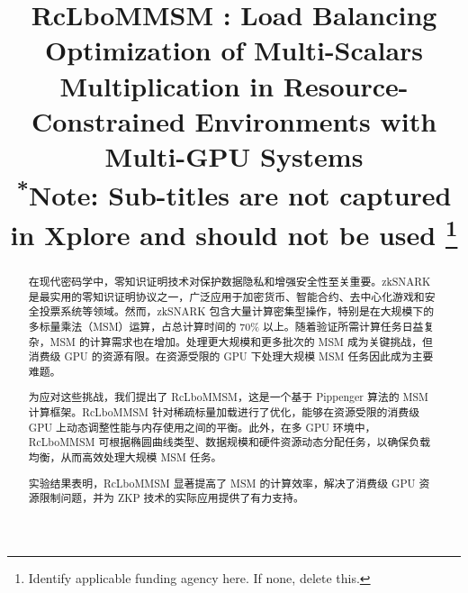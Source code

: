 \documentclass[conference]{IEEEtran}
\begin{document}
\title{RcLboMMSM : Load Balancing Optimization of Multi-Scalars Multiplication in Resource-Constrained Environments with Multi-GPU Systems\\
{\footnotesize \textsuperscript{*}Note: Sub-titles are not captured in Xplore and
should not be used}
\thanks{Identify applicable funding agency here. If none, delete this.}
}

\author{
\and
{}
\and
{}
}

\maketitle

\begin{abstract}
在现代密码学中，零知识证明技术对保护数据隐私和增强安全性至关重要。zkSNARK 是最实用的零知识证明协议之一，广泛应用于加密货币、智能合约、去中心化游戏和安全投票系统等领域。然而，zkSNARK 包含大量计算密集型操作，特别是在大规模下的多标量乘法（MSM）运算，占总计算时间的 70\% 以上。随着验证所需计算任务日益复杂，MSM 的计算需求也在增加。处理更大规模和更多批次的 MSM 成为关键挑战，但消费级 GPU 的资源有限。在资源受限的 GPU 下处理大规模 MSM 任务因此成为主要难题。

为应对这些挑战，我们提出了 RcLboMMSM，这是一个基于 Pippenger 算法的 MSM 计算框架。RcLboMMSM 针对稀疏标量加载进行了优化，能够在资源受限的消费级 GPU 上动态调整性能与内存使用之间的平衡。此外，在多 GPU 环境中，RcLboMMSM 可根据椭圆曲线类型、数据规模和硬件资源动态分配任务，以确保负载均衡，从而高效处理大规模 MSM 任务。

实验结果表明，RcLboMMSM 显著提高了 MSM 的计算效率，解决了消费级 GPU 资源限制问题，并为 ZKP 技术的实际应用提供了有力支持。
\end{abstract}
\end{document}
